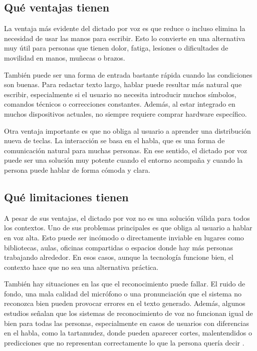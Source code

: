\subsection{Qué ventajas tienen}

La ventaja más evidente del dictado por voz es que reduce o incluso elimina la necesidad de usar las manos para escribir. Esto lo convierte en una alternativa muy útil para personas que tienen dolor, fatiga, lesiones o dificultades de movilidad en manos, muñecas o brazos.

También puede ser una forma de entrada bastante rápida cuando las condiciones son buenas. Para redactar texto largo, hablar puede resultar más natural que escribir, especialmente si el usuario no necesita introducir muchos símbolos, comandos técnicos o correcciones constantes. Además, al estar integrado en muchos dispositivos actuales, no siempre requiere comprar hardware específico.

Otra ventaja importante es que no obliga al usuario a aprender una distribución nueva de teclas. La interacción se basa en el habla, que es una forma de comunicación natural para muchas personas. En ese sentido, el dictado por voz puede ser una solución muy potente cuando el entorno acompaña y cuando la persona puede hablar de forma cómoda y clara.

\subsection{Qué limitaciones tienen}

A pesar de sus ventajas, el dictado por voz no es una solución válida para todos los contextos. Uno de sus problemas principales es que obliga al usuario a hablar en voz alta. Esto puede ser incómodo o directamente inviable en lugares como bibliotecas, aulas, oficinas compartidas o espacios donde hay más personas trabajando alrededor. En esos casos, aunque la tecnología funcione bien, el contexto hace que no sea una alternativa práctica.

También hay situaciones en las que el reconocimiento puede fallar. El ruido de fondo, una mala calidad del micrófono o una pronunciación que el sistema no reconozca bien pueden provocar errores en el texto generado. Además, algunos estudios señalan que los sistemas de reconocimiento de voz no funcionan igual de bien para todas las personas, especialmente en casos de usuarios con diferencias en el habla, como la tartamudez, donde pueden aparecer cortes, malentendidos o predicciones que no representan correctamente lo que la persona quería decir \cite{lea2023stutter}.


